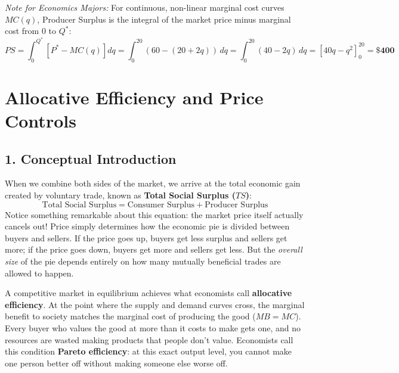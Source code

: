 \documentclass[11pt,letterpaper]{article}
\begin{document}
\begin{tcolorbox}[colback=red!5!white,colframe=red!75!black,title=\textbf{Optional Advanced Section: Calculus Extension}]
\small
\emph{Note for Economics Majors:} 
For continuous, non-linear marginal cost curves $MC(q)$, Producer Surplus is the integral of the market price minus marginal cost from 0 to $Q^*$:
\[
PS = \int_{0}^{Q^*} \left[ P^* - MC(q) \right] dq = \int_{0}^{20} (60 - (20 + 2q))\,dq = \int_{0}^{20} (40 - 2q)\,dq = \left[ 40q - q^2 \right]_{0}^{20} = \mathbf{\$400}
\]
\end{tcolorbox}

\section{Allocative Efficiency and Price Controls}

\subsection*{1. Conceptual Introduction}
When we combine both sides of the market, we arrive at the total economic gain created by voluntary trade, known as \textbf{Total Social Surplus ($TS$)}:
\begin{equation}
\text{Total Social Surplus} = \text{Consumer Surplus} + \text{Producer Surplus}
\end{equation}
Notice something remarkable about this equation: the market price itself actually cancels out! Price simply determines how the economic pie is divided between buyers and sellers. If the price goes up, buyers get less surplus and sellers get more; if the price goes down, buyers get more and sellers get less. But the \emph{overall size} of the pie depends entirely on how many mutually beneficial trades are allowed to happen.

A competitive market in equilibrium achieves what economists call \textbf{allocative efficiency}. At the point where the supply and demand curves cross, the marginal benefit to society matches the marginal cost of producing the good ($MB = MC$). Every buyer who values the good at more than it costs to make gets one, and no resources are wasted making products that people don't value. Economists call this condition \textbf{Pareto efficiency}: at this exact output level, you cannot make one person better off without making someone else worse off.
\end{document}

